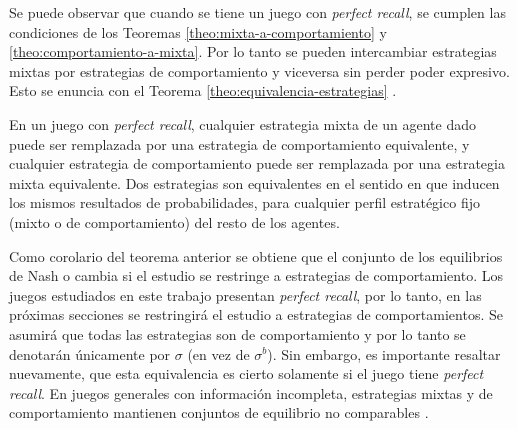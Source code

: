 Se puede observar que cuando se tiene un juego con \textit{perfect recall}, se cumplen las condiciones de los Teoremas \ref{theo:mixta-a-comportamiento} y \ref{theo:comportamiento-a-mixta}. Por lo tanto se pueden intercambiar estrategias mixtas por estrategias de comportamiento y viceversa sin perder poder expresivo. Esto se enuncia con el Teorema \ref{theo:equivalencia-estrategias} \cite[p.~45]{bib:handbook-blai}.

\begin{theorem}
\label{theo:equivalencia-estrategias}
En un juego con \textit{perfect recall}, cualquier estrategia mixta de un agente dado puede ser remplazada por una estrategia de comportamiento equivalente, y cualquier estrategia de comportamiento puede ser remplazada por una estrategia mixta equivalente. Dos estrategias son equivalentes en el sentido en que inducen los mismos resultados de probabilidades, para cualquier perfil estratégico fijo (mixto o de comportamiento) del resto de los agentes.
\end{theorem}

Como corolario del teorema anterior se obtiene que el conjunto de los equilibrios de Nash o cambia si el estudio se restringe a estrategias de comportamiento. Los juegos estudiados en este trabajo presentan \textit{perfect recall}, por lo tanto, en las próximas secciones se restringirá el estudio a estrategias de comportamientos. Se asumirá que todas las estrategias son de comportamiento y por lo tanto se denotarán únicamente por $\sigma$ (en vez de $\sigma^b$). Sin embargo, es importante resaltar nuevamente, que esta equivalencia es cierto solamente si el juego tiene \textit{perfect recall}. En juegos generales con información incompleta, estrategias mixtas y de comportamiento mantienen conjuntos de equilibrio no comparables \cite[p.~45]{bib:handbook-blai}.


